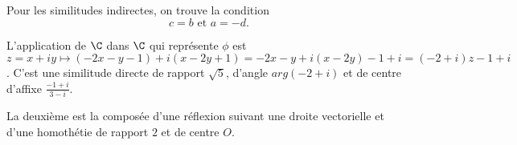 {{Pour les similitudes indirectes, on trouve la condition \[ c=b \text{ et } a=-d.\]

L'application de $\C$ dans $\C$ qui représente $\phi$ est
$z=x+iy \mapsto (-2x-y-1)+i(x-2y+1) = -2x-y + i(x-2y)-1+i = (-2+i)z-1+i$.  C'est une similitude directe de rapport $\sqrt 5$, d'angle $arg(-2+i)$ et de centre d'affixe $\frac{-1+i}{3-i}$.

La deuxième est la composée d'une réflexion suivant une droite vectorielle et d'une homothétie de rapport $2$ et de centre $O$.
}
}

